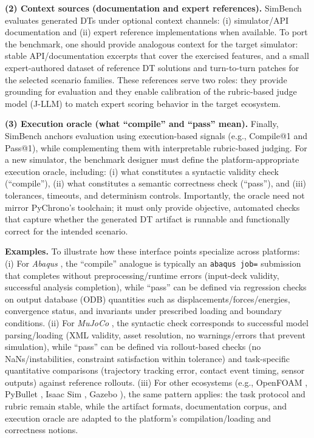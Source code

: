 \documentclass{ieeeaccess}
\begin{document}
\textbf{(2) Context sources (documentation and expert references).}
SimBench evaluates generated DTs under optional context channels: (i) simulator/API documentation and (ii) expert reference implementations when available. To port the benchmark, one should provide analogous context for the target simulator: stable API/documentation excerpts that cover the exercised features, and a small expert-authored dataset of reference DT solutions and turn-to-turn patches for the selected scenario families. These references serve two roles: they provide grounding for evaluation and they enable calibration of the rubric-based judge model (J-LLM) to match expert scoring behavior in the target ecosystem.

\textbf{(3) Execution oracle (what ``compile'' and ``pass'' mean).}
Finally, SimBench anchors evaluation using execution-based signals (e.g., Compile@1 and Pass@1), while complementing them with interpretable rubric-based judging. For a new simulator, the benchmark designer must define the platform-appropriate execution oracle, including: (i) what constitutes a syntactic validity check (``compile''), (ii) what constitutes a semantic correctness check (``pass''), and (iii) tolerances, timeouts, and determinism controls. Importantly, the oracle need not mirror PyChrono's toolchain; it must only provide objective, automated checks that capture whether the generated DT artifact is runnable and functionally correct for the intended scenario.

\textbf{Examples.}
To illustrate how these interface points specialize across platforms:
(i) For \emph{Abaqus} \cite{ABAQUSreference}, the ``compile'' analogue is typically an \texttt{abaqus job=} submission that completes without preprocessing/runtime errors (input-deck validity, successful analysis completion), while ``pass'' can be defined via regression checks on output database (ODB) quantities such as displacements/forces/energies, convergence status, and invariants under prescribed loading and boundary conditions.
(ii) For \emph{MuJoCo} \cite{todorovMujoco2012}, the syntactic check corresponds to successful model parsing/loading (XML validity, asset resolution, no warnings/errors that prevent simulation), while ``pass'' can be defined via rollout-based checks (no NaNs/instabilities, constraint satisfaction within tolerance) and task-specific quantitative comparisons (trajectory tracking error, contact event timing, sensor outputs) against reference rollouts.
(iii) For other ecosystems (e.g., OpenFOAM \cite{openFoam}, PyBullet \cite{Pybullet2023}, Isaac Sim \cite{IssacNvidia2023}, Gazebo \cite{gazebo}), the same pattern applies: the task protocol and rubric remain stable, while the artifact formats, documentation corpus, and execution oracle are adapted to the platform's compilation/loading and correctness notions.
\end{document}
